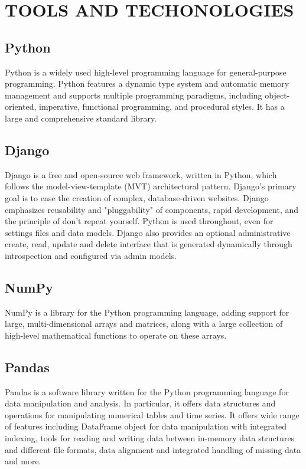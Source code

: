 \newpage
\section{TOOLS AND TECHONOLOGIES}
\subsection{Python}
Python is a widely used high-level programming language for general-purpose programming. Python features a dynamic type system and automatic memory management and supports multiple programming paradigms, including object-oriented, imperative, functional programming, and procedural styles. It has a large and comprehensive standard library.

\subsection{Django}
Django is a free and open-source web framework, written in Python, which follows the model-view-template (MVT) architectural pattern. Django's primary goal is to ease the creation of complex, database-driven websites. Django emphasizes reusability and "pluggability" of components, rapid development, and the principle of don't repeat yourself. Python is used throughout, even for settings files and data models. Django also provides an optional administrative create, read, update and delete interface that is generated dynamically through introspection and configured via admin models.

\subsection{NumPy}
 NumPy is a library for the Python programming language, adding support for large, multi-dimensional arrays and matrices, along with a large collection of high-level mathematical functions to operate on these arrays.

\subsection{Pandas}
Pandas is a software library written for the Python programming language for data manipulation and analysis. In particular, it offers data structures and operations for manipulating numerical tables and time series. It offers wide range of features including DataFrame object for data manipulation with integrated indexing, tools for reading and writing data between in-memory data structures and different file formats, data alignment and integrated handling of missing data and more.

